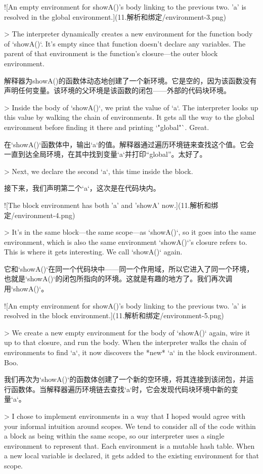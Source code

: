 \documentclass[cn,11pt,chinese]{elegantbook}
\begin{document}
{{{{{{{{{{{{![An empty environment for showA()'s body linking to the previous two. 'a' is resolved in the global environment.](11.解析和绑定/environment-3.png)

> The interpreter dynamically creates a new environment for the function body of `showA()`. It’s empty since that function doesn’t declare any variables. The parent of that environment is the function’s closure—the outer block environment.

解释器为showA()的函数体动态地创建了一个新环境。它是空的，因为该函数没有声明任何变量。该环境的父环境是该函数的闭包——外部的代码块环境。

> Inside the body of `showA()`, we print the value of `a`. The interpreter looks up this value by walking the chain of environments. It gets all the way to the global environment before finding it there and printing `"global"`. Great.

在`showA()`函数体中，输出`a`的值。解释器通过遍历环境链来查找这个值。它会一直到达全局环境，在其中找到变量`a`并打印“global”。太好了。

> Next, we declare the second `a`, this time inside the block.

接下来，我们声明第二个`a`，这次是在代码块内。

![The block environment has both 'a' and 'showA' now.](11.解析和绑定/environment-4.png)

> It’s in the same block—the same scope—as `showA()`, so it goes into the same environment, which is also the same environment `showA()`’s closure refers to. This is where it gets interesting. We call `showA()` again.

它和`showA()`在同一个代码块中——同一个作用域，所以它进入了同一个环境，也就是`showA()`的闭包所指向的环境。这就是有趣的地方了。我们再次调用`showA()`。

![An empty environment for showA()'s body linking to the previous two. 'a' is resolved in the block environment.](11.解析和绑定/environment-5.png)

> We create a new empty environment for the body of `showA()` again, wire it up to that closure, and run the body. When the interpreter walks the chain of environments to find `a`, it now discovers the *new* `a` in the block environment. Boo.

我们再次为`showA()`的函数体创建了一个新的空环境，将其连接到该闭包，并运行函数体。当解释器遍历环境链去查找`a`时，它会发现代码块环境中新的变量`a`。

> I chose to implement environments in a way that I hoped would agree with your informal intuition around scopes. We tend to consider all of the code within a block as being within the same scope, so our interpreter uses a single environment to represent that. Each environment is a mutable hash table. When a new local variable is declared, it gets added to the existing environment for that scope.

}}}}}}}}}}}}
\end{document}
